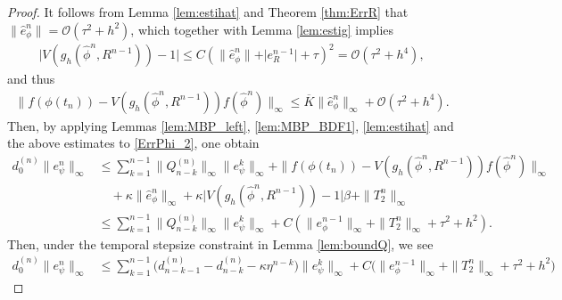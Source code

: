 \documentclass{m2an}
\newcommand{\mo}{\mathcal{O}}
\begin{document}
\begin{proof}
	It follows from Lemma \ref{lem:estihat} and Theorem \ref{thm:ErrR} that
	$ \| \hat{e}_{\phi}^{n} \|  =\mo ( \tau^2 + h^2 )$, which together with Lemma \ref{lem:estig}  implies
	\begin{equation*}
		\begin{aligned}
			\big\vert V( g_h(\hat{\phi}^{n}, R^{n-1}) ) - 1 \big\vert \leq C( \| \hat{e}_\phi^{n} \| + \vert e_{R}^{n-1} \vert + \tau )^2 =\mo ( \tau^2 + h^4 ),
		\end{aligned}
	\end{equation*}
	and thus
	\begin{equation*}
		\begin{aligned}
			\| f( \phi( t_{n} ) ) - V( g_h(\hat{\phi}^{n}, R^{n-1}) ) f(\hat{\phi}^{n}) \|_{\infty} \leq \overline{K} \| \hat{e}_\phi^{n} \|_{\infty} + \mo (  \tau^2 + h^4 ).
		\end{aligned}
	\end{equation*}
	Then, by applying Lemmas \ref{lem:MBP_left}, \ref{lem:MBP_BDF1}, \ref{lem:estihat} and the above estimates to \eqref{ErrPhi_2}, one obtain
	\begin{equation*}
		\begin{aligned}
			d^{(n)}_{0} \| e_{\psi}^n \|_{\infty} 
			& \leq  \sum^{n-1}_{k=1} \| Q^{(n)}_{n-k} \|_{\infty} \| e_{\psi}^k \|_{\infty} + \| f( \phi( t_{n} ) ) - V( g_h(\hat{\phi}^{n}, R^{n-1}) ) f(\hat{\phi}^{n}) \|_{\infty} \\
			& \quad  + \kappa \| \hat{e}_\phi^{n} \|_{\infty} + \kappa \big\vert V( g_h(\hat{\phi}^{n}, R^{n-1}) ) - 1 \big\vert \beta + \| T_2^n \|_{\infty} \\
			& \leq \sum^{n-1}_{k=1} \| Q^{(n)}_{n-k}\|_{\infty} \| e_{\psi}^k \|_{\infty} + C ( \| e_\phi^{n-1} \|_{\infty} + \| T_2^n \|_{\infty} + \tau^2 + h^2 ).
		\end{aligned}
	\end{equation*}
	Then, under the temporal stepsize constraint in Lemma \ref{lem:boundQ}, we see
	\begin{equation*}
		\begin{aligned}
			d^{(n)}_{0} \| e_{\psi}^n \|_{\infty} & \leq \sum^{n-1}_{k=1} \big( d_{n-k-1}^{(n)}-d_{n-k}^{(n)} - \kappa \eta^{n-k} \big) 
			\| e_{\psi}^k \|_{\infty} + C \big( \| e_\phi^{n-1} \|_{\infty} + \| T_2^n \|_{\infty} + \tau^2 + h^2 \big)

\end{aligned}
\end{equation*}
\end{proof}
\end{document}
